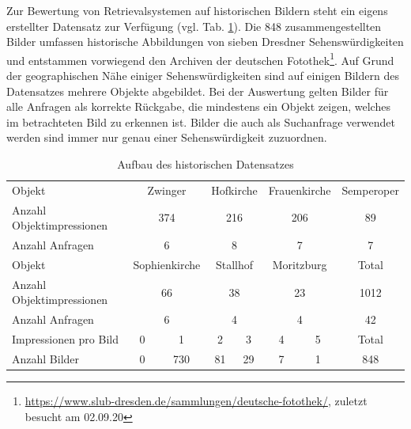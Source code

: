Zur Bewertung von Retrievalsystemen auf historischen Bildern steht ein eigens erstellter Datensatz zur Verfügung (vgl. Tab. \ref{hist4d_data}). Die 848 zusammengestellten Bilder umfassen historische Abbildungen von sieben Dresdner Sehenswürdigkeiten und entstammen vorwiegend den Archiven der deutschen Fotothek\footnote{\url{https://www.slub-dresden.de/sammlungen/deutsche-fotothek/}, zuletzt besucht am 02.09.20}. Auf Grund der geographischen Nähe einiger Sehenswürdigkeiten sind auf einigen Bildern des Datensatzes mehrere Objekte abgebildet. Bei der Auswertung gelten Bilder für alle Anfragen als korrekte Rückgabe, die mindestens ein Objekt zeigen, welches im betrachteten Bild zu erkennen ist. Bilder die auch als Suchanfrage verwendet werden sind immer nur genau einer Sehenswürdigkeit zuzuordnen.\\
\begin{table}[h]
\centering

\begin{tabular}{l|c|c|c|c|c|c|c}
\rowcolor[HTML]{C0C0C0} 
Objekt &
  \multicolumn{2}{c|}{\cellcolor[HTML]{C0C0C0}Zwinger} &
  \multicolumn{2}{c|}{\cellcolor[HTML]{C0C0C0}Hofkirche} &
  \multicolumn{2}{c|}{\cellcolor[HTML]{C0C0C0}Frauenkirche} &
  Semperoper \\
Anzahl Objektimpressionen & \multicolumn{2}{c|}{374} & \multicolumn{2}{c|}{216} & \multicolumn{2}{c|}{206} & 89    \\
Anzahl Anfragen           & \multicolumn{2}{c|}{6}   & \multicolumn{2}{c|}{8}   & \multicolumn{2}{c|}{7}   & 7     \\ \hline
\rowcolor[HTML]{C0C0C0} 
Objekt &
  \multicolumn{2}{c|}{\cellcolor[HTML]{C0C0C0}Sophienkirche} &
  \multicolumn{2}{c|}{\cellcolor[HTML]{C0C0C0}Stallhof} &
  \multicolumn{2}{c|}{\cellcolor[HTML]{C0C0C0}Moritzburg} &
  Total \\
Anzahl Objektimpressionen & \multicolumn{2}{c|}{66}  & \multicolumn{2}{c|}{38}  & \multicolumn{2}{c|}{23}  & 1012  \\
Anzahl Anfragen           & \multicolumn{2}{c|}{6}   & \multicolumn{2}{c|}{4}   & \multicolumn{2}{c|}{4}   & 42    \\ \hline
\rowcolor[HTML]{C0C0C0} 
Impressionen pro Bild     & \hspace{2.5mm} 0 \hspace{2.5mm}         & 1           & \hspace{1.1mm} 2 \hspace{1.1mm}           & 3          & \hspace{2mm} 4 \hspace{2mm}           & 5          & Total \\
Anzahl Bilder             & 0          & 730         & 81          & 29         & 7           & 1          & 848  
\end{tabular}%

\caption{Aufbau des historischen Datensatzes}
\label{hist4d_data}
\end{table}
